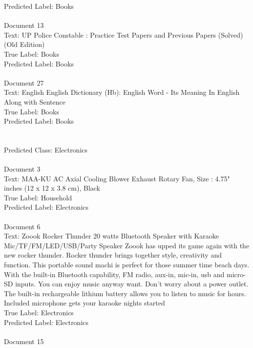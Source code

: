 \documentclass[a4paper,12pt]{article}
\begin{document}
{Predicted Label: Books\\
\\ Document 13\\
Text: UP Police Constable : Practice Test Papers and Previous Papers (Solved) (Old Edition)\\
True Label: Books\\
Predicted Label: Books\\
\\ Document 27\\
Text: English English Dictionary  (Hb): English Word - Its Meaning In English Along with Sentence \\
True Label: Books\\
Predicted Label: Books\\
\\\\ Predicted Class: Electronics\\
\\Document 3\\
Text: MAA-KU AC Axial Cooling Blower Exhaust Rotary Fan, Size : 4.75" inches (12 x 12 x 3.8 cm), Black\\
True Label: Household\\
Predicted Label: Electronics\\
\\ Document 6\\
Text: Zoook Rocker Thunder 20 watts Bluetooth Speaker with Karaoke Mic/TF/FM/LED/USB/Party Speaker Zoook has upped its game again with the new rocker thunder. Rocker thunder brings together style, creativity and function. This portable sound machi is perfect for those summer time beach days. With the built-in Bluetooth capability, FM radio, aux-in, mic-in, usb and micro-SD inputs. You can enjoy music anyway want. Don't worry about a power outlet. The built-in rechargeable lithium battery allows you to listen to music for hours. Included microphone gets your karaoke nights started\\
True Label: Electronics\\
Predicted Label: Electronics\\
\\ Document 15\\
}
\end{document}
